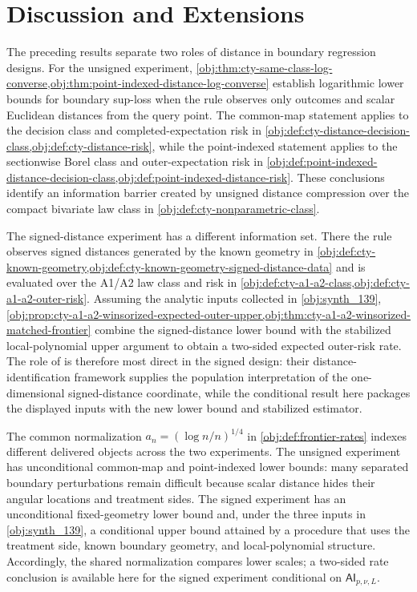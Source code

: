 \section{Discussion and Extensions}
\label{sec:discussion}

The preceding results separate two roles of distance in boundary regression designs. For the unsigned experiment, \cref{obj:thm:cty-same-class-log-converse,obj:thm:point-indexed-distance-log-converse} establish logarithmic lower bounds for boundary sup-loss when the rule observes only outcomes and scalar Euclidean distances from the query point. The common-map statement applies to the decision class and completed-expectation risk in \cref{obj:def:cty-distance-decision-class,obj:def:cty-distance-risk}, while the point-indexed statement applies to the sectionwise Borel class and outer-expectation risk in \cref{obj:def:point-indexed-distance-decision-class,obj:def:point-indexed-distance-risk}. These conclusions identify an information barrier created by unsigned distance compression over the compact bivariate law class in \cref{obj:def:cty-nonparametric-class}.

The signed-distance experiment has a different information set. There the rule observes signed distances generated by the known geometry in \cref{obj:def:cty-known-geometry,obj:def:cty-known-geometry-signed-distance-data} and is evaluated over the A1/A2 law class and risk in \cref{obj:def:cty-a1-a2-class,obj:def:cty-a1-a2-outer-risk}. Assuming the analytic inputs collected in \cref{obj:synth_139}, \cref{obj:prop:cty-a1-a2-winsorized-expected-outer-upper,obj:thm:cty-a1-a2-winsorized-matched-frontier} combine the signed-distance lower bound with the stabilized local-polynomial upper argument to obtain a two-sided expected outer-risk rate. The role of \citet{CattaneoTitiunikYu2026Distance} is therefore most direct in the signed design: their distance-identification framework supplies the population interpretation of the one-dimensional signed-distance coordinate, while the conditional result here packages the displayed inputs with the new lower bound and stabilized estimator.

The common normalization \(a_n=(\log n/n)^{1/4}\) in \cref{obj:def:frontier-rates} indexes different delivered objects across the two experiments. The unsigned experiment has unconditional common-map and point-indexed lower bounds: many separated boundary perturbations remain difficult because scalar distance hides their angular locations and treatment sides. The signed experiment has an unconditional fixed-geometry lower bound and, under the three inputs in \cref{obj:synth_139}, a conditional upper bound attained by a procedure that uses the treatment side, known boundary geometry, and local-polynomial structure. Accordingly, the shared normalization compares lower scales; a two-sided rate conclusion is available here for the signed experiment conditional on \(\mathsf{AI}_{p,\nu,L}\).

